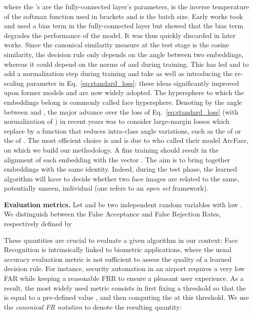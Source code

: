 \documentclass[nohyperref]{article}
\theoremstyle{plain}
\theoremstyle{definition}
\theoremstyle{remark}
\begin{document}
where the 's are the fully-connected layer's parameters,  is the inverse temperature of the softmax function used in brackets and  is the batch size. Early works \cite{deepface,deepID} took  and used a bias term in the fully-connected layer but \cite{normface} showed that the bias term degrades the performance of the model. It was thus quickly discarded in later works. 
Since the canonical similarity measure at the test stage is the cosine similarity, the decision rule only depends on the angle between two embeddings, whereas it could depend on the norms of  and  during training. This has led \cite{normface} and \cite{vmf_deep_learning} to add a normalization step during training and take  as well as introducing the re-scaling parameter  in Eq.~\ref{eq:standard_loss}: these ideas significantly improved upon former models and are now widely adopted. The hypersphere  to which the embeddings belong is commonly called face hypersphere.
Denoting by  the angle between  and , the major advance over the loss of Eq.~\ref{eq:standard_loss} (with normalization of ) in recent years was to consider large-margin losses which replace  by a function that reduces intra-class angle variations, such as the  of \cite{sphereface} or the  of \cite{cosface}. The most efficient choice is  and is due to \cite{arcface} who called their model ArcFace, on which we build our methodology. A fine training should result in the alignment of each embedding  with the vector . The aim is to bring together embeddings with the same identity. Indeed, during the test phase, the learned algorithm will have to decide whether two face images are related to the same, potentially unseen, individual (one refers to an {\it open set} framework).

{\bf Evaluation metrics.} Let  and  be two independent random variables with law . We distinguish between the False Acceptance and False Rejection Rates, respectively defined by 

These quantities are crucial to evaluate a given algorithm in our context: Face Recognition is intrinsically linked to biometric applications, where the usual accuracy evaluation metric is not sufficient to assess the quality of a learned decision rule. For instance, security automation in an airport requires a very low FAR while keeping a reasonable FRR to ensure a pleasant user experience. As a result, the most widely used metric consists in first fixing a threshold  so that the  is equal to a pre-defined value , and then computing the  at this threshold. We use the {\it canonical FR notation} to denote the resulting quantity:
\end{document}
